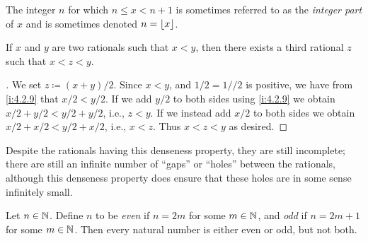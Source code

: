 \begin{rmk}\label{i:4.4.2}
  The integer \(n\) for which \(n \leq x < n + 1\) is sometimes referred to as the \emph{integer part} of \(x\) and is sometimes denoted \(n = \left\lfloor x\right\rfloor\).
\end{rmk}

\begin{prop}\label{i:4.4.3}
  If \(x\) and \(y\) are two rationals such that \(x < y\), then there exists a third rational \(z\) such that \(x < z < y\).
\end{prop}

\begin{proof}[]
  We set \(z \coloneqq (x + y) / 2\).
  Since \(x < y\), and \(1 / 2 = 1 // 2\) is positive, we have from \cref{i:4.2.9} that \(x / 2 < y / 2\).
  If we add \(y / 2\) to both sides using \cref{i:4.2.9} we obtain \(x / 2 + y / 2 < y / 2 + y / 2\), i.e., \(z < y\).
  If we instead add \(x / 2\) to both sides we obtain \(x / 2 + x / 2 < y / 2 + x / 2\), i.e., \(x < z\).
  Thus \(x < z < y\) as desired.
\end{proof}

\begin{note}
  Despite the rationals having this denseness property, they are still incomplete;
  there are still an infinite number of ``gaps'' or ``holes'' between the rationals, although this denseness property does ensure that these holes are in some sense infinitely small.
\end{note}

\begin{ac}\label{i:ac:4.4.2}
  Let \(n \in \mathbb{N}\).
  Define \(n\) to be \emph{even} if \(n = 2m\) for some \(m \in \mathbb{N}\), and \emph{odd} if \(n = 2m + 1\) for some \(m \in \mathbb{N}\).
  Then every natural number is either even or odd, but not both.
\end{ac}

